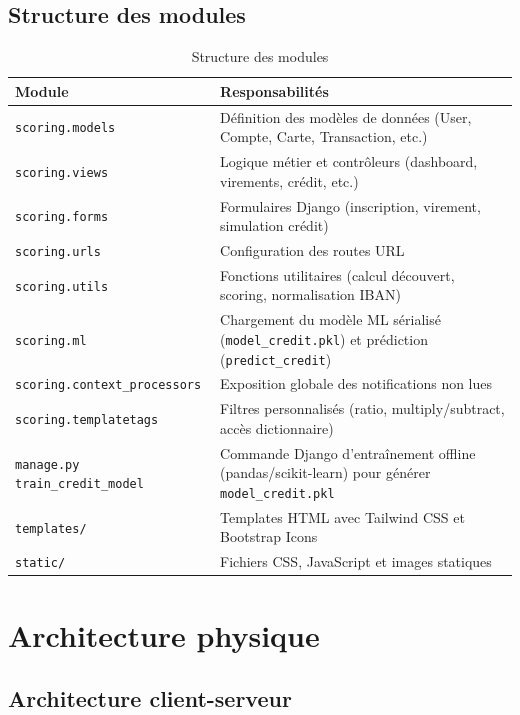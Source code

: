 \documentclass[12pt,a4paper]{report}
\begin{document}
\subsection{Structure des modules}

\begin{table}[H]
\centering
\begin{tabular}{|p{4cm}|p{10cm}|}
\hline
\rowcolor{banquiseblue!30}
\textbf{Module} & \textbf{Responsabilités} \\
\hline
\texttt{scoring.models} & Définition des modèles de données (User, Compte, Carte, Transaction, etc.) \\
\hline
\texttt{scoring.views} & Logique métier et contrôleurs (dashboard, virements, crédit, etc.) \\
\hline
\texttt{scoring.forms} & Formulaires Django (inscription, virement, simulation crédit) \\
\hline
\texttt{scoring.urls} & Configuration des routes URL \\
\hline
\texttt{scoring.utils} & Fonctions utilitaires (calcul découvert, scoring, normalisation IBAN) \\
\hline
\texttt{scoring.ml} & Chargement du modèle ML sérialisé (\texttt{model\_credit.pkl}) et prédiction (\texttt{predict\_credit}) \\
\hline
\texttt{scoring.context\_processors} & Exposition globale des notifications non lues \\
\hline
\texttt{scoring.templatetags} & Filtres personnalisés (ratio, multiply/subtract, accès dictionnaire) \\
\hline
\texttt{manage.py train\_credit\_model} & Commande Django d'entraînement offline (pandas/scikit-learn) pour générer \texttt{model\_credit.pkl} \\
\hline
\texttt{templates/} & Templates HTML avec Tailwind CSS et Bootstrap Icons \\
\hline
\texttt{static/} & Fichiers CSS, JavaScript et images statiques \\
\hline
\end{tabular}
\caption{Structure des modules}
\end{table}

\section{Architecture physique}

\subsection{Architecture client-serveur}
\end{document}
